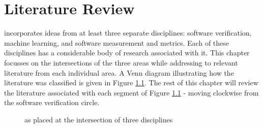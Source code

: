 \chapter{Literature Review}%
\thispagestyle{nohead}
\label{LitReview} %


\where incorporates ideas from at least three separate disciplines: software verification, machine learning, and software measurement and metrics. Each of these disciplines has a considerable body of research associated with it. This chapter focusses on the intersections of the three areas while addressing to relevant literature from each individual area.
A Venn diagram illustrating how the literature was classified is given in Figure \ref{fig:litreview}. 
The rest of this chapter will review the literature associated with each segment of Figure \ref{fig:litreview} - moving clockwise from the software verification circle.


\begin{figure}

\centering
\def\firstcircle{(3cm,0cm) circle (2.5cm)}
\def\secondcircle{(0cm,0cm) circle (2.5cm)}
\def\thirdcircle{(1.5cm,3cm) circle (2.5cm)}

\caption{\where as placed at the intersection of three disciplines}
\label{fig:litreview}

\end{figure}


